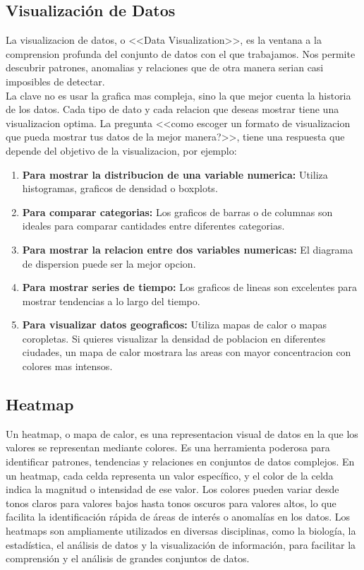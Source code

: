 \documentclass[12pt]{article}
\begin{document}
\subsection{Visualización de Datos}
La visualizacion de datos, o <<Data Visualization>>, es la ventana a la comprension profunda del conjunto de datos con el que trabajamos. Nos permite descubrir patrones, anomalias y relaciones que de otra manera serian casi imposibles de detectar.
\\
La clave no es usar la grafica mas compleja, sino la que mejor cuenta la historia de los datos. Cada tipo de dato y cada relacion que deseas mostrar tiene una visualizacion optima. La pregunta <<como escoger un formato de visualizacion que pueda mostrar tus datos de la mejor manera?>>, tiene una respuesta que depende del objetivo de la visualizacion, por ejemplo:
\begin{enumerate}
    \item \textbf{Para mostrar la distribucion de una variable numerica:} Utiliza histogramas, graficos de densidad o boxplots.
    \item \textbf{Para comparar categorias:} Los graficos de barras o de columnas son ideales para comparar cantidades entre diferentes categorias.
    \item \textbf{Para mostrar la relacion entre dos variables numericas:} El diagrama de dispersion puede ser la mejor opcion.
    \item \textbf{Para mostrar series de tiempo:} Los graficos de lineas son excelentes para mostrar tendencias a lo largo del tiempo.
    \item \textbf{Para visualizar datos geograficos:} Utiliza mapas de calor o mapas coropletas. Si quieres visualizar la densidad de poblacion en diferentes ciudades, un mapa de calor mostrara las areas con mayor concentracion con colores mas intensos.
\end{enumerate} 
\cite{De0a100enIA}

\subsection{Heatmap}
Un heatmap, o mapa de calor, es una representacion visual de datos en la que los valores se representan mediante colores. Es una herramienta poderosa para identificar patrones, tendencias y relaciones en conjuntos de datos complejos. En un heatmap, cada celda representa un valor específico, y el color de la celda indica la magnitud o intensidad de ese valor. Los colores pueden variar desde tonos claros para valores bajos hasta tonos oscuros para valores altos, lo que facilita la identificación rápida de áreas de interés o anomalías en los datos. Los heatmaps son ampliamente utilizados en diversas disciplinas, como la biología, la estadística, el análisis de datos y la visualización de información, para facilitar la comprensión y el análisis de grandes conjuntos de datos.
\cite{De0a100enIA_2}
\end{document}

